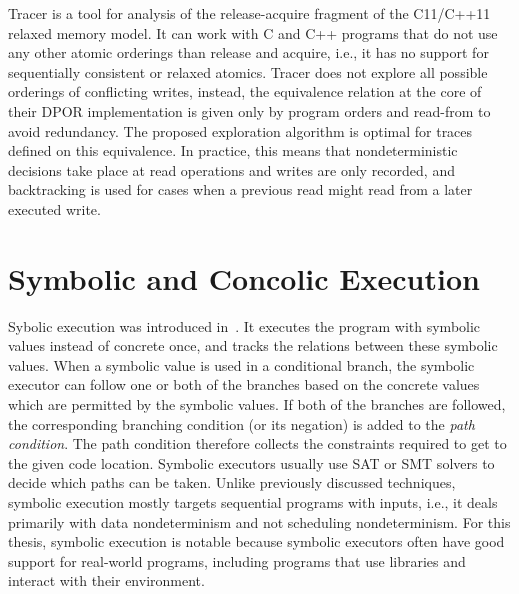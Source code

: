 Tracer  is a tool for analysis of the release-acquire fragment of the C11/C++11 relaxed memory model.
It can work with C and C++ programs that do not use any other atomic orderings than release and acquire, i.e., it has no support for sequentially consistent or relaxed atomics.
Tracer does not explore all possible orderings of conflicting writes, instead, the equivalence relation at the core of their DPOR implementation is given only by program orders and read-from to avoid redundancy.
The proposed exploration algorithm is optimal for traces defined on this equivalence.
In practice, this means that nondeterministic decisions take place at read operations and writes are only recorded, and backtracking is used for cases when a previous read might read from a later executed write.


\section{Symbolic and Concolic Execution}

Sybolic execution was introduced in~.
It executes the program with symbolic values instead of concrete once, and tracks the relations between these symbolic values.
When a symbolic value is used in a conditional branch, the symbolic executor can follow one or both of the branches based on the concrete values which are permitted by the symbolic values.
If both of the branches are followed, the corresponding branching condition (or its negation) is added to the \emph{path condition}.
The path condition therefore collects the constraints required to get to the given code location.
Symbolic executors usually use SAT or SMT solvers to decide which paths can be taken.
Unlike previously discussed techniques, symbolic execution mostly targets sequential programs with inputs, i.e., it deals primarily with data nondeterminism and not scheduling nondeterminism.
For this thesis, symbolic execution is notable because symbolic executors often have good support for real-world programs, including programs that use libraries and interact with their environment.

